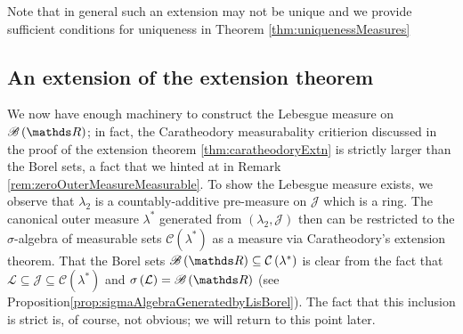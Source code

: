 Note that in general such an extension may not be unique and we provide
sufficient conditions for uniqueness in Theorem \ref{thm:uniquenessMeasures}

\subsection{An extension of the extension theorem}

We now have enough machinery to construct the Lebesgue measure on
$\borel\left(\R\right)$; in fact, the Caratheodory measurabality
critierion discussed in the proof of the extension theorem \ref{thm:caratheodoryExtn}
is strictly larger than the Borel sets, a fact that we hinted at in
Remark \ref{rem:zeroOuterMeasureMeasurable}. To show the Lebesgue
measure exists, we observe that $\lambda_{2}$ is a countably-additive
pre-measure on $\mathcal{J}$ which is a ring. The canonical outer
measure $\lambda^{*}$ generated from $\left(\lambda_{2},\mathcal{J}\right)$
then can be restricted to the $\sigma$-algebra of measurable sets
$\mathcal{C}\left(\lambda^{*}\right)$ as a measure via Caratheodory's
extension theorem. That the Borel sets $\borel\left(\R\right)\subseteq\mathcal{C}\left(\lambda^{*}\right)$
is clear from the fact that $\mathcal{L}\subseteq\mathcal{\mathcal{J}\subseteq C}\left(\lambda^{*}\right)$
and $\sigma\left(\mathcal{L}\right)=\borel\left(\R\right)$ (see Proposition\ref{prop:sigmaAlgebraGeneratedbyLisBorel}).
The fact that this inclusion is strict is, of course, not obvious;
we will return to this point later.

